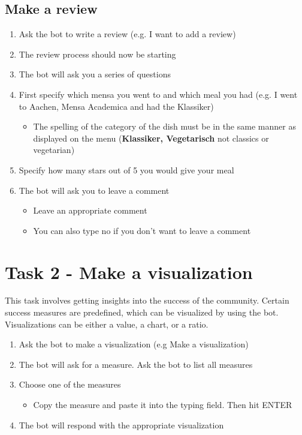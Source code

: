 \subsection*{Make a review}
\begin{enumerate}
    \item Ask the bot to write a review (e.g. I want to add a review)
    \item The review process should now be starting 
    \item The bot will ask you a series of questions
    \item First specify which mensa you went to and which meal you had (e.g. I went to Aachen, Mensa Academica and had the Klassiker) 
    \begin{itemize}
      \item The spelling of the category of the dish must be in the same manner as displayed on the menu (\textbf{Klassiker, Vegetarisch} not classics or vegetarian)
    \end{itemize}
    \item Specify how many stars out of 5 you would give your meal
    \item The bot will ask you to leave a comment
    \begin{itemize}
        \item Leave an appropriate comment
        \item You can also type no if you don't want to leave a comment
      \end{itemize}
\end{enumerate}

\section*{Task 2 - Make a visualization}
This task involves getting insights into the success of the community. Certain success measures are predefined, which can be visualized by using the bot. Visualizations can be either a value, a chart, or a ratio.
\begin{enumerate}
    \item Ask the bot to make a visualization (e.g Make a visualization)
    \item The bot will ask for a measure. Ask the bot to list all measures
    \item Choose one of the measures 
    \begin{itemize}
        \item Copy the measure and paste it into the typing field. Then hit ENTER
    \end{itemize}
    \item The bot will respond with the appropriate visualization
    
\end{enumerate}


